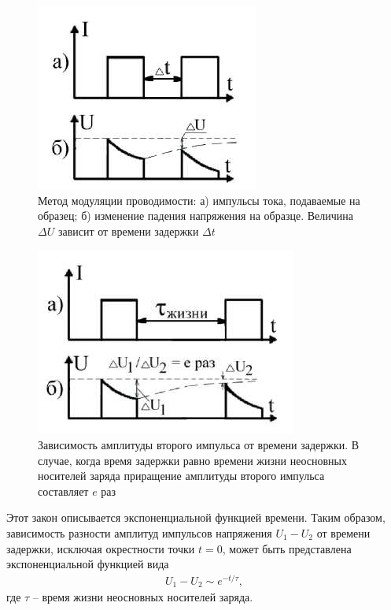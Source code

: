\documentclass[a4paper,12pt]{article}
\begin{document}
\begin{figure}[H]
	\centering
	\includegraphics[]{9}
	\caption{Метод модуляции проводимости: а) импульсы тока, подаваемые на образец; б) изменение падения напряжения на образце. Величина $\Delta U$ зависит от времени задержки $\Delta t$}
	\label{fig:figure8}
\end{figure}

\begin{figure}[H]
	\centering
	\includegraphics[]{10}
	\caption{Зависимость амплитуды второго импульса от времени задержки. В случае, когда время задержки равно времени жизни неосновных носителей заряда приращение амплитуды второго импульса составляет $e$ раз}
	\label{fig:figure9}
\end{figure}



Этот закон описывается экспоненциальной функцией времени. Таким образом, зависимость разности амплитуд импульсов напряжения  $U_1-U_2$ от времени задержки, исключая окрестности точки $t = 0$, может быть представлена экспоненциальной функцией вида
\begin{gather}
	\label{eq17}
	U_{1}-U_{2} \sim e^{-t/\tau},
\end{gather}
где $\tau$ -- время жизни неосновных носителей заряда.
\end{document}
